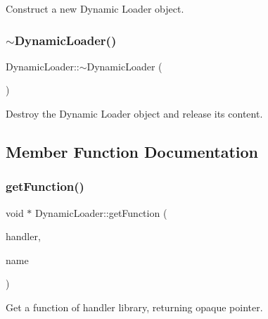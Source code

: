 Construct a new Dynamic Loader object. 

\mbox{\label{classo_z_1_1_dynamic_loader_a48b8658929c54dbb03a79f752d2fc131}} 
\subsubsection{\texorpdfstring{$\sim$DynamicLoader()}{~DynamicLoader()}}
{\footnotesize\ttfamily Dynamic\+Loader\+::$\sim$\+Dynamic\+Loader (\begin{DoxyParamCaption}\item[{void}]{ }\end{DoxyParamCaption})}



Destroy the Dynamic Loader object and release its content. 



\subsection{Member Function Documentation}
\mbox{\label{classo_z_1_1_dynamic_loader_a136f9d35245f4e3d556d7f4eae951cdf}} 
\subsubsection{\texorpdfstring{getFunction()}{getFunction()}\hspace{0.1cm}{\footnotesize\ttfamily [1/2]}}
{\footnotesize\ttfamily void $\ast$ Dynamic\+Loader\+::get\+Function (\begin{DoxyParamCaption}\item[{\mbox{\hyperlink{namespaceo_z_acbfabf71824b5fc6a3beb64e397afc19}{Dynamic\+Handler}}}]{handler,  }\item[{const std\+::string \&}]{name }\end{DoxyParamCaption})}



Get a function of handler library, returning opaque pointer. 

\mbox{\label{classo_z_1_1_dynamic_loader_ad5c090a613bec9cf397a479bf3257cfa}} 
